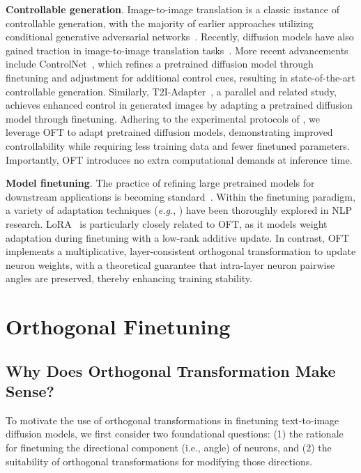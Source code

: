 \textbf{Controllable generation}. Image-to-image translation is a classic instance of controllable generation, with the majority of earlier approaches utilizing conditional generative adversarial networks~\cite{isola2017image,zhu2017toward,wang2018high,park2019semantic,choi2018stargan}. Recently, diffusion models have also gained traction in image-to-image translation tasks~\cite{saharia2022palette,voynov2022sketch,wang2022pretraining}. More recent advancements include ControlNet~\cite{zhang2023adding}, which refines a pretrained diffusion model through finetuning and adjustment for additional control cues, resulting in state-of-the-art controllable generation. Similarly, T2I-Adapter~\cite{mou2023t2i}, a parallel and related study, achieves enhanced control in generated images by adapting a pretrained diffusion model through finetuning. Adhering to the experimental protocols of \cite{zhang2023adding,mou2023t2i}, we leverage OFT to adapt pretrained diffusion models, demonstrating improved controllability while requiring less training data and fewer finetuned parameters. Importantly, OFT introduces no extra computational demands at inference time.

\textbf{Model finetuning}. The practice of refining large pretrained models for downstream applications is becoming standard~\cite{devlin2018bert,brown2020language,he2022masked}. Within the finetuning paradigm, a variety of adaptation techniques (\emph{e.g.}, \cite{hulora2022,houlsby2019parameter,pfeiffer2020adapterfusion}) have been thoroughly explored in NLP research. LoRA~\cite{hulora2022} is particularly closely related to OFT, as it models weight adaptation during finetuning with a low-rank additive update. In contrast, OFT implements a multiplicative, layer-consistent orthogonal transformation to update neuron weights, with a theoretical guarantee that intra-layer neuron pairwise angles are preserved, thereby enhancing training stability.

\section{Orthogonal Finetuning}

\subsection{Why Does Orthogonal Transformation Make Sense?}

To motivate the use of orthogonal transformations in finetuning text-to-image diffusion models, we first consider two foundational questions: (1) the rationale for finetuning the directional component (i.e., angle) of neurons, and (2) the suitability of orthogonal transformations for modifying those directions.

